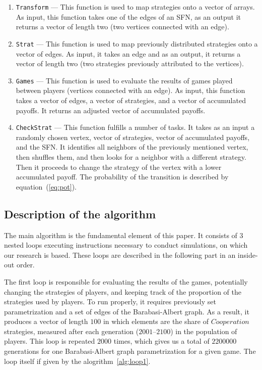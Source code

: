 \documentclass[english, twoside, 12pt, a4paper]{article}
\theoremstyle{definition}
\theoremstyle{plain}
\theoremstyle{remark}
\begin{document}
\begin{enumerate}
  \item \lstinline+Transform+ --- This function is used to map strategies onto a vector of arrays. As input, this function takes one of the edges of an SFN, as an output it returns a vector of length two (two vertices connected with an edge).
  \item \lstinline+Strat+ --- This function is used to map previously distributed strategies onto a vector of edges. As input, it takes an edge and as an output, it returns a vector of length two (two strategies previously attributed to the vertices).
  \item \lstinline+Games+ --- This function is used to evaluate the results of games played between players (vertices connected with an edge). As input, this function takes a vector of edges, a vector of strategies, and a vector of accumulated payoffs. It returns an adjusted vector of accumulated payoffs.
  \item \lstinline+CheckStrat+ --- This function fulfills a number of tasks. It takes as an input a randomly chosen vertex, vector of strategies, vector of accumulated payoffs, and the SFN. It identifies all neighbors of the previously mentioned vertex, then shuffles them, and then looks for a neighbor with a different strategy. Then it proceeds to change the strategy of the vertex with a lower accumulated payoff. The probability of the transition is described by equation~(\ref{eq:pot}).
\end{enumerate}

\subsection{Description of the algorithm}

The main algorithm is the fundamental element of this paper. It consists of 3 nested loops executing instructions necessary to conduct simulations, on which our research is based. These loops are described in the following part in an inside-out order. 

The first loop is responsible for evaluating the results of the games, potentially changing the strategies of players, and keeping track of the proportion of the strategies used by players. To run properly, it requires previously set parametrization and a set of edges of the Barabasi-Albert graph. As a result, it produces a vector of length \(100\) in which elements are the share of $Cooperation$ strategies, measured after each generation (\(2001\)--\(2100\)) in the population of players. This loop is repeated \(2000\) times, which gives us a total of \(2200000\) generations for one Barabasi-Albert graph parametrization for a given game.
The loop itself if given by the alogrithm~\ref{alg:loop1}.
\end{document}
